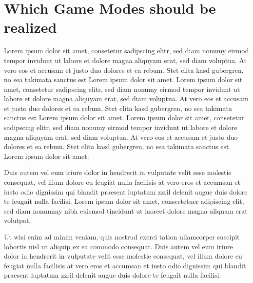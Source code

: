 \chapter{Which Game Modes should be realized} 

Lorem ipsum dolor sit amet, consetetur sadipscing elitr, sed diam nonumy eirmod tempor invidunt ut labore et dolore magna aliquyam erat, sed diam voluptua. At vero eos et accusam et justo duo dolores et ea rebum. Stet clita kasd gubergren, no sea takimata sanctus est Lorem ipsum dolor sit amet. Lorem ipsum dolor sit amet, consetetur sadipscing elitr, sed diam nonumy eirmod tempor invidunt ut labore et dolore magna aliquyam erat, sed diam voluptua. At vero eos et accusam et justo duo dolores et ea rebum. Stet clita kasd gubergren, no sea takimata sanctus est Lorem ipsum dolor sit amet. Lorem ipsum dolor sit amet, consetetur sadipscing elitr, sed diam nonumy eirmod tempor invidunt ut labore et dolore magna aliquyam erat, sed diam voluptua. At vero eos et accusam et justo duo dolores et ea rebum. Stet clita kasd gubergren, no sea takimata sanctus est Lorem ipsum dolor sit amet.   

Duis autem vel eum iriure dolor in hendrerit in vulputate velit esse molestie consequat, vel illum dolore eu feugiat nulla facilisis at vero eros et accumsan et iusto odio dignissim qui blandit praesent luptatum zzril delenit augue duis dolore te feugait nulla facilisi. Lorem ipsum dolor sit amet, consectetuer adipiscing elit, sed diam nonummy nibh euismod tincidunt ut laoreet dolore magna aliquam erat volutpat.   

Ut wisi enim ad minim veniam, quis nostrud exerci tation ullamcorper suscipit lobortis nisl ut aliquip ex ea commodo consequat. Duis autem vel eum iriure dolor in hendrerit in vulputate velit esse molestie consequat, vel illum dolore eu feugiat nulla facilisis at vero eros et accumsan et iusto odio dignissim qui blandit praesent luptatum zzril delenit augue duis dolore te feugait nulla facilisi.   















